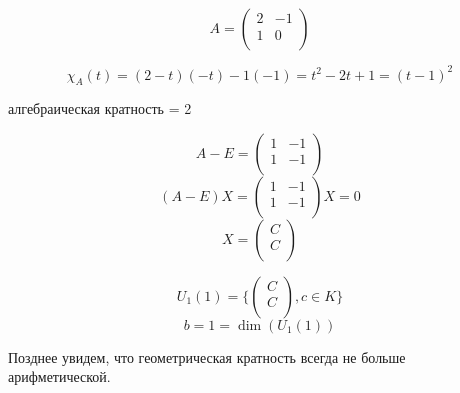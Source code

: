 \begin{exmp}
$$A = \begin{pmatrix}
2 & -1\\
1 & 0\\
\end{pmatrix}$$

$$\chi_A(t) = (2 - t)(-t) - 1(-1) = t^2 - 2t + 1 = (t - 1)^2$$

алгебраическая кратность = 2

$$A - E = \begin{pmatrix} 
1&-1\\
1&-1\\
\end{pmatrix} $$
$$
(A - E)X =
\begin{pmatrix}
1&-1\\
1&-1\\
\end{pmatrix}X = 0 
$$
$$
X = \begin{pmatrix}
C\\
C\\
\end{pmatrix}
$$

$$U_1(1) = \{\begin{pmatrix} C\\ C\\ \end{pmatrix}, c \in K \} $$
$$b = 1 = \dim(U_1(1)) $$

Позднее увидем, что геометрическая кратность всегда 
не больше арифметической.

\end{exmp}
 
